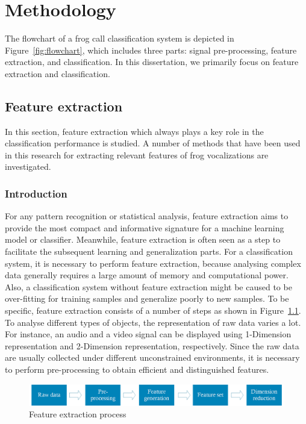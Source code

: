 
\chapter[Methodology]{Methodology}
\label{cha:cha3Method}

The flowchart of a frog call classification system is depicted in Figure~\ref{fig:flowchart}, which includes three parts: signal pre-processing, feature extraction, and classification. In this dissertation, we primarily focus on feature extraction and classification.


\section{Feature extraction}

In this section, feature extraction which always plays a key role in the classification performance is studied. A number of methods that have been used in this research for extracting relevant features of frog vocalizations are investigated.

\subsection{Introduction}

For any pattern recognition or statistical analysis, feature extraction aims to provide the most compact and informative signature for a machine learning model or classifier. Meanwhile, feature extraction is often seen as a step to facilitate the subsequent learning and generalization parts. For a classification system, it is necessary to perform feature extraction, because analysing complex data generally requires a large amount of memory and computational power. Also, a classification system without feature extraction might be caused to be over-fitting for training samples and generalize poorly to new samples.  To be specific, feature extraction consists of a number of steps as shown in Figure~\ref{fig:feature_extraction}. To analyse different types of objects, the representation of raw data varies a lot. For instance, an audio and a video signal can be displayed using 1-Dimension representation and 2-Dimension representation, respectively.  Since the raw data are usually collected under different unconstrained environments, it is necessary to perform pre-processing to obtain efficient and distinguished features.   


\begin{figure}[htb!]
\centering
\includegraphics[width=\textwidth]{image/Method/feature_extraction.png}
\caption[Feature extraction process]{Feature extraction process}
\label{fig:feature_extraction}
\end{figure}

